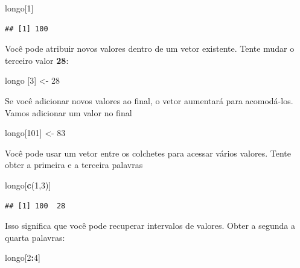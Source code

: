 \documentclass[]{book}
\newenvironment{Shaded}{\begin{snugshade}}{\end{snugshade}}
\newcommand{\DecValTok}[1]{\textcolor[rgb]{0.00,0.00,0.81}{#1}}
\newcommand{\KeywordTok}[1]{\textcolor[rgb]{0.13,0.29,0.53}{\textbf{#1}}}
\newcommand{\NormalTok}[1]{#1}
\newcommand{\OperatorTok}[1]{\textcolor[rgb]{0.81,0.36,0.00}{\textbf{#1}}}
\newcommand{\StringTok}[1]{\textcolor[rgb]{0.31,0.60,0.02}{#1}}
\begin{document}
\begin{Shaded}
\begin{Highlighting}[]
\NormalTok{longo[}\DecValTok{1}\NormalTok{]}
\end{Highlighting}
\end{Shaded}

\begin{verbatim}
## [1] 100
\end{verbatim}

Você pode atribuir novos valores dentro de um vetor existente. Tente mudar o terceiro valor \textbf{28}:

\begin{Shaded}
\begin{Highlighting}[]
\NormalTok{longo [}\DecValTok{3}\NormalTok{] <-}\StringTok{ }\DecValTok{28}
\end{Highlighting}
\end{Shaded}

Se você adicionar novos valores ao final, o vetor aumentará para acomodá-los. Vamos adicionar um valor no final

\begin{Shaded}
\begin{Highlighting}[]
\NormalTok{longo[}\DecValTok{101}\NormalTok{] <-}\StringTok{ }\DecValTok{83}
\end{Highlighting}
\end{Shaded}

Você pode usar um vetor entre os colchetes para acessar vários valores. Tente obter a primeira e a terceira palavras

\begin{Shaded}
\begin{Highlighting}[]
\NormalTok{longo[}\KeywordTok{c}\NormalTok{(}\DecValTok{1}\NormalTok{,}\DecValTok{3}\NormalTok{)]}
\end{Highlighting}
\end{Shaded}

\begin{verbatim}
## [1] 100  28
\end{verbatim}

Isso significa que você pode recuperar intervalos de valores. Obter a segunda a quarta palavras:

\begin{Shaded}
\begin{Highlighting}[]
\NormalTok{longo[}\DecValTok{2}\OperatorTok{:}\DecValTok{4}\NormalTok{]}
\end{Highlighting}
\end{Shaded}
\end{document}
